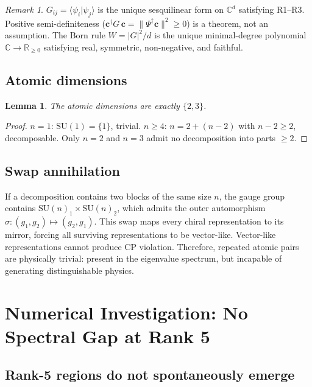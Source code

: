 \documentclass[12pt]{article}
\newtheorem{lemma}[theorem]{Lemma}
\theoremstyle{remark}
\newtheorem{remark}[theorem]{Remark}
\begin{document}
\begin{remark}
$G_{ij} = \langle\psi_i|\psi_j\rangle$ is the unique sesquilinear form on $\mathbb{C}^d$ satisfying R1--R3. Positive semi-definiteness ($\mathbf{c}^\dagger G\,\mathbf{c} = \|\Psi^\dagger\mathbf{c}\|^2 \geq 0$) is a theorem, not an assumption. The Born rule $W = |G|^2/d$ is the unique minimal-degree polynomial $\mathbb{C} \to \mathbb{R}_{\geq 0}$ satisfying real, symmetric, non-negative, and faithful.
\end{remark}

\subsection{Atomic dimensions}

\begin{lemma}
The atomic dimensions are exactly $\{2, 3\}$.
\end{lemma}

\begin{proof}
$n = 1$: $\text{SU}(1) = \{1\}$, trivial. $n \geq 4$: $n = 2 + (n-2)$ with $n-2 \geq 2$, decomposable. Only $n = 2$ and $n = 3$ admit no decomposition into parts $\geq 2$.
\end{proof}

\subsection{Swap annihilation}

If a decomposition contains two blocks of the same size $n$, the gauge group contains $\text{SU}(n)_1 \times \text{SU}(n)_2$, which admits the outer automorphism $\sigma: (g_1, g_2) \mapsto (g_2, g_1)$. This swap maps every chiral representation to its mirror, forcing all surviving representations to be vector-like. Vector-like representations cannot produce CP violation. Therefore, repeated atomic pairs are physically trivial: present in the eigenvalue spectrum, but incapable of generating distinguishable physics.

\section{Numerical Investigation: No Spectral Gap at Rank 5}

\subsection{Rank-5 regions do not spontaneously emerge}
\end{document}
